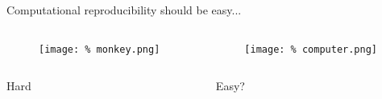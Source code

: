 \begin{frame}{Computational reproducibility should be easy...}

  \begin{columns}
    \begin{column}{.5\textwidth}
      \begin{figure}
        \centering
        \texttt{[image: \%
          monkey.png]}  %
      \end{figure}
      
    \end{column}
    \begin{column}{.5\textwidth}

      \begin{figure}
        \centering
        \texttt{[image: \%
          computer.png]}  %
      \end{figure}
      
    \end{column}
  \end{columns}

  \begin{columns}
    \begin{column}{.5\textwidth}
      \begin{center}
        Hard
      \end{center}
      
    \end{column}
    \begin{column}{.5\textwidth}
      \begin{center}
        Easy?
      \end{center}
      
    \end{column}
  \end{columns}
  
\end{frame}


